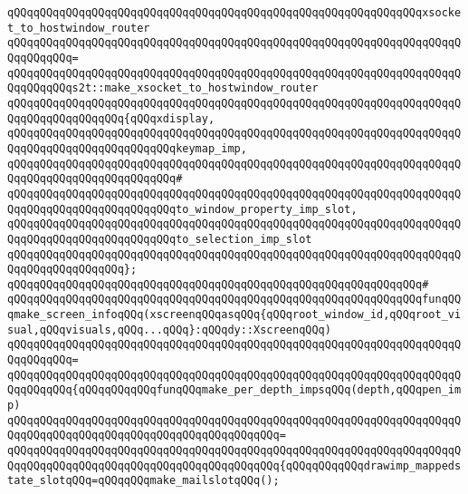 \newline
\verb|qQQqqQQqqQQqqQQqqQQqqQQqqQQqqQQqqQQqqQQqqQQqqQQqqQQqqQQqqQQqqQQqxsocket_to_hostwindow_router|\newline
\verb|qQQqqQQqqQQqqQQqqQQqqQQqqQQqqQQqqQQqqQQqqQQqqQQqqQQqqQQqqQQqqQQqqQQqqQQqqQQqqQQq=|\newline
\verb|qQQqqQQqqQQqqQQqqQQqqQQqqQQqqQQqqQQqqQQqqQQqqQQqqQQqqQQqqQQqqQQqqQQqqQQqqQQqqQQqs2t::make_xsocket_to_hostwindow_router|\newline
\verb|qQQqqQQqqQQqqQQqqQQqqQQqqQQqqQQqqQQqqQQqqQQqqQQqqQQqqQQqqQQqqQQqqQQqqQQqqQQqqQQqqQQqqQQq{qQQqxdisplay,|\newline
\verb|qQQqqQQqqQQqqQQqqQQqqQQqqQQqqQQqqQQqqQQqqQQqqQQqqQQqqQQqqQQqqQQqqQQqqQQqqQQqqQQqqQQqqQQqqQQqqQQqkeymap_imp,|\newline
\verb|qQQqqQQqqQQqqQQqqQQqqQQqqQQqqQQqqQQqqQQqqQQqqQQqqQQqqQQqqQQqqQQqqQQqqQQqqQQqqQQqqQQqqQQqqQQqqQQq#|\newline
\verb|qQQqqQQqqQQqqQQqqQQqqQQqqQQqqQQqqQQqqQQqqQQqqQQqqQQqqQQqqQQqqQQqqQQqqQQqqQQqqQQqqQQqqQQqqQQqqQQqto_window_property_imp_slot,|\newline
\verb|qQQqqQQqqQQqqQQqqQQqqQQqqQQqqQQqqQQqqQQqqQQqqQQqqQQqqQQqqQQqqQQqqQQqqQQqqQQqqQQqqQQqqQQqqQQqqQQqto_selection_imp_slot|\newline
\verb|qQQqqQQqqQQqqQQqqQQqqQQqqQQqqQQqqQQqqQQqqQQqqQQqqQQqqQQqqQQqqQQqqQQqqQQqqQQqqQQqqQQqqQQq};|\newline
\verb|qQQqqQQqqQQqqQQqqQQqqQQqqQQqqQQqqQQqqQQqqQQqqQQqqQQqqQQqqQQqqQQq#|\newline
\verb|qQQqqQQqqQQqqQQqqQQqqQQqqQQqqQQqqQQqqQQqqQQqqQQqqQQqqQQqqQQqqQQqfunqQQqmake_screen_infoqQQq(xscreenqQQqasqQQq{qQQqroot_window_id,qQQqroot_visual,qQQqvisuals,qQQq...qQQq}:qQQqdy::XscreenqQQq)|\newline
\verb|qQQqqQQqqQQqqQQqqQQqqQQqqQQqqQQqqQQqqQQqqQQqqQQqqQQqqQQqqQQqqQQqqQQqqQQqqQQqqQQq=|\newline
\verb|qQQqqQQqqQQqqQQqqQQqqQQqqQQqqQQqqQQqqQQqqQQqqQQqqQQqqQQqqQQqqQQqqQQqqQQqqQQqqQQq{qQQqqQQqqQQqfunqQQqmake_per_depth_impsqQQq(depth,qQQqpen_imp)|\newline
\verb|qQQqqQQqqQQqqQQqqQQqqQQqqQQqqQQqqQQqqQQqqQQqqQQqqQQqqQQqqQQqqQQqqQQqqQQqqQQqqQQqqQQqqQQqqQQqqQQqqQQqqQQqqQQqqQQq=|\newline
\verb|qQQqqQQqqQQqqQQqqQQqqQQqqQQqqQQqqQQqqQQqqQQqqQQqqQQqqQQqqQQqqQQqqQQqqQQqqQQqqQQqqQQqqQQqqQQqqQQqqQQqqQQqqQQqqQQq{qQQqqQQqqQQqdrawimp_mappedstate_slotqQQq=qQQqqQQqmake_mailslotqQQq();|\newline
\newline
